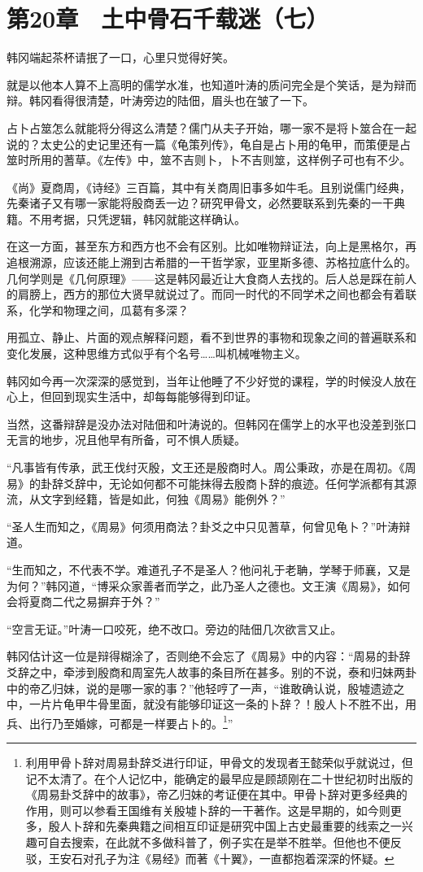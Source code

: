 \section{第20章　土中骨石千载迷（七）}

韩冈端起茶杯请抿了一口，心里只觉得好笑。

就是以他本人算不上高明的儒学水准，也知道叶涛的质问完全是个笑话，是为辩而辩。韩冈看得很清楚，叶涛旁边的陆佃，眉头也在皱了一下。

占卜占筮怎么就能将分得这么清楚？儒门从夫子开始，哪一家不是将卜筮合在一起说的？太史公的史记里还有一篇《龟策列传》，龟自是占卜用的龟甲，而策便是占筮时所用的蓍草。《左传》中，筮不吉则卜，卜不吉则筮，这样例子可也有不少。

《尚》夏商周，《诗经》三百篇，其中有关商周旧事多如牛毛。且别说儒门经典，先秦诸子又有哪一家能将殷商丢一边？研究甲骨文，必然要联系到先秦的一干典籍。不用考据，只凭逻辑，韩冈就能这样确认。

在这一方面，甚至东方和西方也不会有区别。比如唯物辩证法，向上是黑格尔，再追根溯源，应该还能上溯到古希腊的一干哲学家，亚里斯多德、苏格拉底什么的。几何学则是《几何原理》——这是韩冈最近让大食商人去找的。后人总是踩在前人的肩膀上，西方的那位大贤早就说过了。而同一时代的不同学术之间也都会有着联系，化学和物理之间，瓜葛有多深？

用孤立、静止、片面的观点解释问题，看不到世界的事物和现象之间的普遍联系和变化发展，这种思维方式似乎有个名号……叫机械唯物主义。

韩冈如今再一次深深的感觉到，当年让他睡了不少好觉的课程，学的时候没人放在心上，但回到现实生活中，却每每能够得到印证。

当然，这番辩辞是没办法对陆佃和叶涛说的。但韩冈在儒学上的水平也没差到张口无言的地步，况且他早有所备，可不惧人质疑。

“凡事皆有传承，武王伐纣灭殷，文王还是殷商时人。周公秉政，亦是在周初。《周易》的卦辞爻辞中，无论如何都不可能抹得去殷商卜辞的痕迹。任何学派都有其源流，从文字到经籍，皆是如此，何独《周易》能例外？”

“圣人生而知之，《周易》何须用商法？卦爻之中只见蓍草，何曾见龟卜？”叶涛辩道。

“生而知之，不代表不学。难道孔子不是圣人？他问礼于老聃，学琴于师襄，又是为何？”韩冈道，“博采众家善者而学之，此乃圣人之德也。文王演《周易》，如何会将夏商二代之易摒弃于外？”

“空言无证。”叶涛一口咬死，绝不改口。旁边的陆佃几次欲言又止。

韩冈估计这一位是辩得糊涂了，否则绝不会忘了《周易》中的内容：“周易的卦辞爻辞之中，牵涉到殷商和周室先人故事的条目所在甚多。别的不说，泰和归妹两卦中的帝乙归妹，说的是哪一家的事？”他轻哼了一声，“谁敢确认说，殷墟遗迹之中，一片片龟甲牛骨里面，就没有能够印证这一条的卜辞？！殷人卜不胜不出，用兵、出行乃至婚嫁，可都是一样要占卜的。\footnote{利用甲骨卜辞对周易卦辞爻进行印证，甲骨文的发现者王懿荣似乎就说过，但记不太清了。在个人记忆中，能确定的最早应是顾颉刚在二十世纪初时出版的《周易卦爻辞中的故事》，帝乙归妹的考证便在其中。甲骨卜辞对更多经典的作用，则可以参看王国维有关殷墟卜辞的一干著作。这是早期的，如今则更多，殷人卜辞和先秦典籍之间相互印证是研究中国上古史最重要的线索之一兴趣可自去搜索，在此就不多做科普了，例子实在是举不胜举。但他也不便反驳，王安石对孔子为注《易经》而著《十翼》，一直都抱着深深的怀疑。}”

